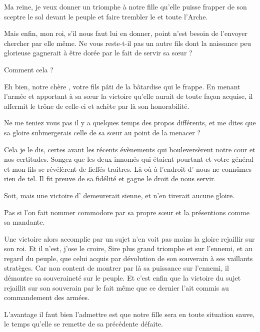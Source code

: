 \begin{drama}
  \roispeaks  Ma reine, je veux donner un triomphe à notre fille qu’elle puisse frapper de son sceptre le sol devant le peuple et faire trembler le \campprincipal{} et toute l’Arche.

  \reinespeaks Mais enfin, mon roi, s’il nous faut lui en donner, point n’est besoin de l’envoyer chercher par elle même. Ne vous reste-t-il pas un autre fils dont la naissance peu glorieuse  gagnerait à être dorée par le fait de servir sa sœur ?


  \roispeaks Comment cela ?

  \reinespeaks Eh bien, notre chère \elena{}, votre fils pâti de la bâtardise qui le frappe. En menant l’armée et apportant à sa sœur la victoire qu’elle aurait de toute façon acquise, il affermit le trône de celle-ci et achète par là son honorabilité.


  \roispeaks Ne me teniez vous pas il y a quelques temps des propos différents, et me dites que sa gloire submergerais celle de sa sœur au point de la menacer ?

  \reinespeaks Cela je le dis, certes avant les récents évènements qui bouleversèrent notre cour et nos certitudes. Songez que les deux innomés qui étaient pourtant et votre général et mon fils se révélèrent de fieffés traitres. Là où à l’endroit d’\elena{} nous ne connûmes rien de tel. Il fit preuve de sa fidélité et gagne le droit de nous servir.


  \roispeaks Soit, mais une victoire d’\elena{} demeurerait sienne, et \princesse{} n’en tirerait aucune gloire.

  \reinespeaks Pas si l’on fait nommer \elena{} commodore par sa propre sœur et la présentions comme sa mandante.

  Une victoire alors accomplie par un sujet n’en voit pas moins la gloire rejaillir sur son roi. Et il n’est, j’ose le croire, Sire plus grand triomphe et sur l’ennemi, et au regard du peuple, que celui acquis par dévolution de son souverain à ses vaillants stratèges.
  Car non content de montrer par là sa puissance sur l’ennemi, il démontre sa souveraineté sur le peuple.
  Et c’est enfin que la victoire du sujet rejaillit sur son souverain par le fait même que ce dernier l’ait commis au commandement des armées.


  \roispeaks L’avantage il faut bien l’admettre est que notre fille sera en toute situation sauve, le temps qu’elle se remette de sa précédente défaite.


\end{drama}
